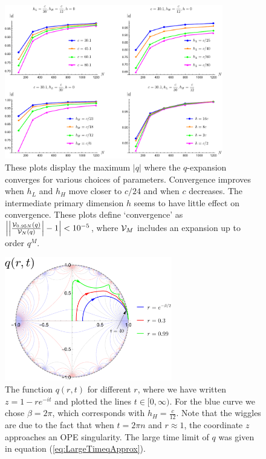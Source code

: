 \documentclass[12pt]{article}
\numberwithin{equation}{section}
\newcommand{\CV}{{\cal V}}
\begin{document}
\begin{figure}
\centering
\includegraphics[width=0.85\textwidth]{qConvergentRange}	
\caption{These plots display the maximum  $|q|$ where the $q$-expansion converges for various choices of parameters.  Convergence improves when $h_L$ and $h_H$ move closer to $c/24$ and when $c$ decreases.  The intermediate primary dimension $h$ seems to have little effect on convergence.   These plots define `convergence' as $\left|\left|\frac{\CV_{0.95N}(q)}{\CV_N(q)}\right|-1\right|<10^{-5}$, where $\CV_M$ includes an expansion up to order $q^M$.} 
\label{qConvergentRange}
\end{figure}


\begin{figure}
\centering
\includegraphics[width=0.65\textwidth]{q_trajectory_with_BC}	
\caption{The function $q(r,t)$ for different $r$, where we have written $z = 1 - r e^{-it}$ and plotted the lines $t \in [0, \infty)$. For the blue curve we chose $\beta = 2 \pi$, which corresponds with $h_H = \frac{c}{12}$.  Note that the wiggles are due to the fact that when $t = 2 \pi n$ and $r \approx 1$, the coordinate $z$ approaches an OPE singularity. The large time limit of $q$ was given in equation (\ref{eq:LargeTimeqApprox}).}
\label{fig:qoft}
\end{figure}
\end{document}
